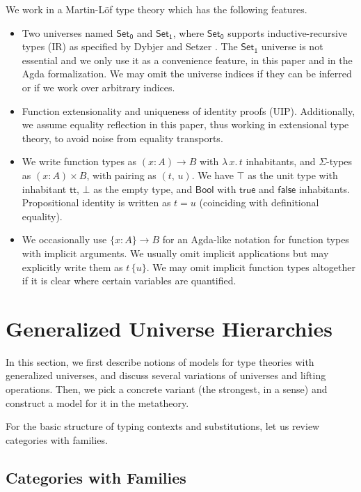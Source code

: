 \documentclass[a4paper,UKenglish,cleveref, autoref, thm-restate]{lipics-v2021}
\theoremstyle{remark}
\theoremstyle{definition}
\newcommand{\Set}[1]{\mathsf{Set_{#1}}}
\newcommand{\Bool}{\mathsf{Bool}}
\newcommand{\true}{\mathsf{true}}
\newcommand{\false}{\mathsf{false}}
\renewcommand{\tt}{\mathsf{tt}}
\begin{document}
We work in a Martin-Löf type theory which has the following features.
\begin{itemize}
  \item Two universes named $\Set0$ and $\Set1$, where $\Set0$ supports
    inductive-recursive types (IR) as specified by Dybjer and Setzer
    \cite{dybjer99finite}. The $\Set1$ universe is not essential and we only use
    it as a convenience feature, in this paper and in the Agda formalization. We
    may omit the universe indices if they can be inferred or if we work over
    arbitrary indices.
  \item Function extensionality and uniqueness of identity proofs
    (UIP). Additionally, we assume equality reflection in this paper, thus
    working in extensional type theory, to avoid noise from equality transports.
  \item We write function types as $(x : A)\to B$ with $\lambda\,x.\,t$
    inhabitants, and $\Sigma$-types as $(x : A) \times B$, with pairing as
    $(t,\, u)$. We have $\top$ as the unit type with inhabitant $\tt$, $\bot$ as
    the empty type, and $\Bool$ with $\true$ and $\false$
    inhabitants. Propositional identity is written as $t = u$ (coinciding with
    definitional equality).
  \item We occasionally use $\{x : A\} \to B$ for an Agda-like notation for
    function types with implicit arguments. We usually omit implicit
    applications but may explicitly write them as $t\,\{u\}$.  We may omit
    implicit function types altogether if it is clear where certain variables
    are quantified.
\end{itemize}

\section{Generalized Universe Hierarchies}
\label{sec:ttgu}

In this section, we first describe notions of models for type theories with
generalized universes, and discuss several variations of universes and lifting
operations. Then, we pick a concrete variant (the strongest, in a sense)
and construct a model for it in the metatheory.

For the basic structure of typing contexts and substitutions, let us review
categories with families.

\subsection{Categories with Families}
\label{sec:categories_with_families}
\end{document}
